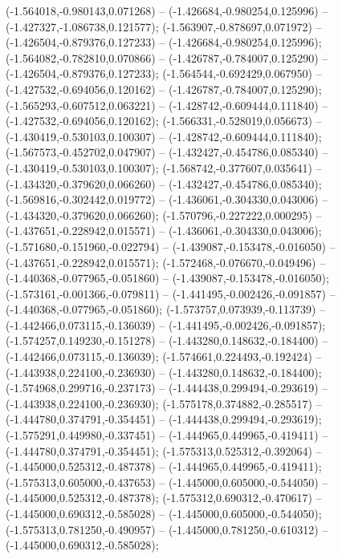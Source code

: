  (-1.564018,-0.980143,0.071268) -- (-1.426684,-0.980254,0.125996) -- (-1.427327,-1.086738,0.121577);
 (-1.563907,-0.878697,0.071972) -- (-1.426504,-0.879376,0.127233) -- (-1.426684,-0.980254,0.125996);
 (-1.564082,-0.782810,0.070866) -- (-1.426787,-0.784007,0.125290) -- (-1.426504,-0.879376,0.127233);
 (-1.564544,-0.692429,0.067950) -- (-1.427532,-0.694056,0.120162) -- (-1.426787,-0.784007,0.125290);
 (-1.565293,-0.607512,0.063221) -- (-1.428742,-0.609444,0.111840) -- (-1.427532,-0.694056,0.120162);
 (-1.566331,-0.528019,0.056673) -- (-1.430419,-0.530103,0.100307) -- (-1.428742,-0.609444,0.111840);
 (-1.567573,-0.452702,0.047907) -- (-1.432427,-0.454786,0.085340) -- (-1.430419,-0.530103,0.100307);
 (-1.568742,-0.377607,0.035641) -- (-1.434320,-0.379620,0.066260) -- (-1.432427,-0.454786,0.085340);
 (-1.569816,-0.302442,0.019772) -- (-1.436061,-0.304330,0.043006) -- (-1.434320,-0.379620,0.066260);
 (-1.570796,-0.227222,0.000295) -- (-1.437651,-0.228942,0.015571) -- (-1.436061,-0.304330,0.043006);
 (-1.571680,-0.151960,-0.022794) -- (-1.439087,-0.153478,-0.016050) -- (-1.437651,-0.228942,0.015571);
 (-1.572468,-0.076670,-0.049496) -- (-1.440368,-0.077965,-0.051860) -- (-1.439087,-0.153478,-0.016050);
 (-1.573161,-0.001366,-0.079811) -- (-1.441495,-0.002426,-0.091857) -- (-1.440368,-0.077965,-0.051860);
 (-1.573757,0.073939,-0.113739) -- (-1.442466,0.073115,-0.136039) -- (-1.441495,-0.002426,-0.091857);
 (-1.574257,0.149230,-0.151278) -- (-1.443280,0.148632,-0.184400) -- (-1.442466,0.073115,-0.136039);
 (-1.574661,0.224493,-0.192424) -- (-1.443938,0.224100,-0.236930) -- (-1.443280,0.148632,-0.184400);
 (-1.574968,0.299716,-0.237173) -- (-1.444438,0.299494,-0.293619) -- (-1.443938,0.224100,-0.236930);
 (-1.575178,0.374882,-0.285517) -- (-1.444780,0.374791,-0.354451) -- (-1.444438,0.299494,-0.293619);
 (-1.575291,0.449980,-0.337451) -- (-1.444965,0.449965,-0.419411) -- (-1.444780,0.374791,-0.354451);
 (-1.575313,0.525312,-0.392064) -- (-1.445000,0.525312,-0.487378) -- (-1.444965,0.449965,-0.419411);
 (-1.575313,0.605000,-0.437653) -- (-1.445000,0.605000,-0.544050) -- (-1.445000,0.525312,-0.487378);
 (-1.575312,0.690312,-0.470617) -- (-1.445000,0.690312,-0.585028) -- (-1.445000,0.605000,-0.544050);
 (-1.575313,0.781250,-0.490957) -- (-1.445000,0.781250,-0.610312) -- (-1.445000,0.690312,-0.585028);
